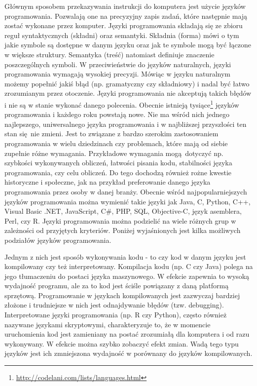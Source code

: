 \documentclass[paper=6in:9in,pagesize=pdftex,headinclude=on,footinclude=on,10pt]{scrbook}
\begin{document}
Głównym sposobem przekazywania instrukcji do komputera jest użycie języków programowania.
Pozwalają one na precyzyjny zapis zadań, które następnie mają zostać wykonane przez komputer.
Języki programowania składają się ze zbioru reguł syntaktycznych (składni) oraz semantyki.
Składnia (forma) mówi o tym jakie symbole są dostępne w danym języku oraz jak te symbole mogą być łączone w większe struktury.
Semantyka (treść) natomiast definiuje znaczenie poszczególnych symboli.
W przeciwieństwie do języków naturalnych, języki programowania wymagają wysokiej precyzji.
Mówiąc w języku naturalnym możemy popełnić jakiś błąd (np. gramatyczny czy składniowy) i nadal być łatwo zrozumianym przez otoczenie.
Języki programowania nie akceptują takich błędów i nie są w stanie wykonać danego polecenia.
Obecnie istnieją tysiące\footnote{\url{http://codelani.com/lists/languages.html}} języków programowania i każdego roku powstają nowe.
Nie ma wśród nich jednego najlepszego, uniwersalnego języka programowania i w najbliższej przyszłości ten stan się~nie zmieni.
Jest to związane z bardzo szerokim zastosowaniem programowania w wielu dziedzinach czy problemach, które mają od siebie zupełnie różne wymagania.
Przykładowe wymagania mogą~dotyczyć np. szybkości wykonywanych obliczeń, łatwości pisania kodu, stabilności języka programowania, czy celu obliczeń.
Do tego dochodzą również rożne kwestie historyczne i społeczne, jak na przykład preferowanie danego języka programowania przez osoby w danej branży.
Obecnie wśród najpopularniejszych języków programowania można wymienić takie języki jak Java, C, Python, C++, Visual Basic .NET, JavaScript, C\#, PHP, SQL, Objective-C, język asemblera, Perl, czy R.
Języki programowania można podzielić na wiele różnych grup w zależności od przyjętych kryteriów.
Poniżej wyjaśnionych jest kilka możliwych podziałów języków programowania.

Jednym z nich jest sposób wykonywania kodu - to czy kod w danym języku jest kompilowany czy też interpretowany.
Kompilacja kodu (np. C czy Java) polega na jego tłumaczeniu do postaci języka maszynowego.
W efekcie zapewnia to wysoką wydajność programu, ale za to kod jest ściśle powiązany z daną platformą sprzętową.
Programowanie w językach kompilowanych jest zazwyczaj bardziej złożone i trudniejsze w nich jest odnajdywanie błędów (tzw. debugging).
Interpretowane języki programowania (np. R czy Python), często również nazywane językami skryptowymi, charakteryzuje to,
że w momencie uruchomienia kod jest zamieniany na postać zrozumiałą dla komputera i od razu wykonywany.
W efekcie można szybko zobaczyć efekt zmian.
Wadą tego typu języków jest ich zmniejszona wydajność w porównany do języków kompilowanych.
\end{document}
